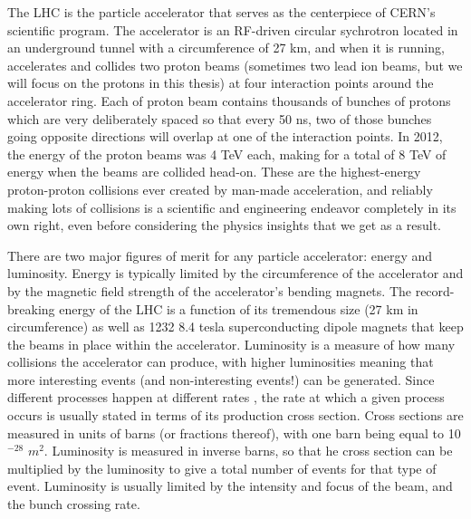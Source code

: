 The LHC is the particle accelerator that serves as the centerpiece of CERN's scientific program.  The accelerator is 
an RF-driven circular sychrotron located in an underground tunnel with a circumference of 27 km, and when 
it is running, accelerates and collides two proton beams (sometimes two lead ion beams, but we will 
focus on the protons in this thesis) at four interaction points around the accelerator ring.  Each of proton beam 
contains thousands of bunches of protons which are very deliberately spaced so that every 50 ns, two 
of those bunches going opposite directions will overlap at one of the interaction points.  In 2012, the energy
of the proton beams was 4 TeV each, making for a total of 8 TeV of energy when the beams are collided head-on.
These are the highest-energy proton-proton collisions ever created by man-made acceleration, and reliably making lots of
collisions is a scientific and engineering endeavor completely in its own right, even before considering
the physics insights that we get as a result.


There are two major figures of merit for any particle accelerator: energy and luminosity.  Energy is typically limited 
by the circumference of the accelerator and by the magnetic field strength of the accelerator's bending magnets.  
The record-breaking energy of the LHC is a function of its tremendous size (27 km in circumference) as 
well as 1232 8.4 tesla superconducting dipole magnets that keep the beams in place within the accelerator.  Luminosity 
 is a measure of how many collisions the accelerator can produce, with higher luminosities meaning that more 
interesting events (and non-interesting events!) can be generated.  Since different processes happen at different rates
, the rate at which a given process occurs is usually stated in terms of its production cross section.  
Cross sections are measured in units of barns (or fractions thereof), with one barn being equal to 10
$^{-28}$ $m^2$.  Luminosity is measured in inverse barns, so that he cross section 
can be multiplied by the luminosity to give a total number of events for that type of event.  Luminosity 
is usually limited by the intensity and focus of the beam, and the bunch crossing rate.



